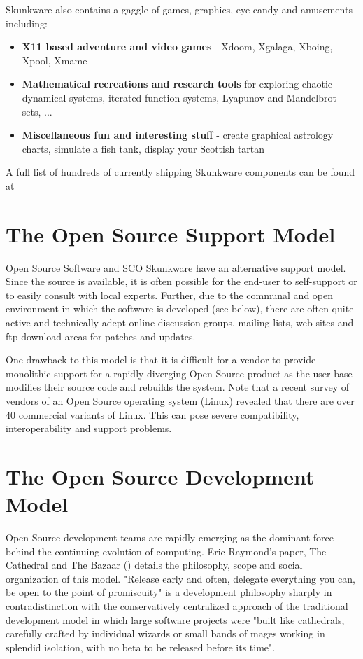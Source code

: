 \documentclass[letterpaper]{article}
\begin{document}
Skunkware also contains a gaggle of games, graphics, eye candy and amusements
including:
\begin{itemize}
\item {\bfseries X11 based adventure and video games} - Xdoom, Xgalaga, Xboing, 
Xpool, Xmame
\item {\bfseries Mathematical recreations and research tools} for exploring chaotic
dynamical systems, iterated function systems, Lyapunov and Mandelbrot sets, ...
\item {\bfseries Miscellaneous fun and interesting stuff} - create graphical 
astrology charts, simulate a fish tank, display your Scottish tartan
\end{itemize}


A full list of hundreds of currently shipping Skunkware components can be 
found at 




\section{The Open Source Support Model}

Open Source Software and SCO Skunkware have an alternative support model.
Since the source is available, it is often possible for the end-user to
self-support or to easily consult with local experts. Further, due to the
communal and open environment in which the software is developed (see below),
there are often quite active and technically adept online discussion groups,
mailing lists, web sites and ftp download areas for patches and updates.

One drawback to this model is that it is difficult for a vendor to provide
monolithic support for a rapidly diverging Open Source product as the user
base modifies their source code and rebuilds the system. Note that a recent
survey of vendors of an Open Source operating system (Linux) revealed that
there are over 40 commercial variants of Linux. This can pose severe
compatibility, interoperability and support problems.




\section{The Open Source Development Model}

Open Source development teams are rapidly emerging as the dominant force
behind the continuing evolution of computing. Eric Raymond's paper,
The Cathedral and The Bazaar 
()
details the philosophy, scope and social organization of this model.
"Release early and often, delegate everything you can, be
open to the point of promiscuity" is a development philosophy sharply
in contradistinction with the conservatively centralized approach
of the traditional development model in which large software projects
were "built like cathedrals, carefully crafted by individual 
wizards or small bands of mages working in splendid isolation, with no 
beta to be released before its time".
\end{document}
